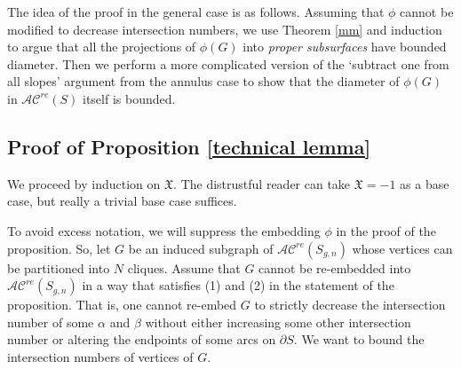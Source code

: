 \documentclass[11pt]{amsart}
\theoremstyle{remark}
\numberwithin{equation}{section}
\newcommand{\cAC}{\mathcal{AC}}
\newcommand{\acre}{\cAC^{re}}
\begin{document}
%



 




	
The idea of the proof in the general case is as follows. Assuming that $\phi$ cannot be modified to decrease intersection numbers, we use Theorem \ref{mm} and induction to argue that all the projections of $\phi(G)$ into \emph{proper subsurfaces} have bounded diameter.  Then we perform a more complicated version of the `subtract one from all slopes' argument from the annulus case to show that the diameter of $\phi(G)$ in $\acre(S)$ itself is bounded.
 
\subsection{Proof of Proposition \ref{technical lemma}}
We proceed by induction on $\mathfrak X$.  The distrustful reader can take $\mathfrak X=-1$ as a base case, but really a trivial base case suffices. 

 To avoid excess notation, we will suppress the embedding $\phi$ in the proof of the proposition. So, let $G$ be an  induced subgraph of $\acre(S_{g,n})$ whose vertices can be partitioned into $N$ cliques. Assume that $G$ cannot be re-embedded into $\acre(S_{g,n})$ in a way that satisfies (1) and (2) in the statement of the proposition. That is, one cannot re-embed $G$ to strictly decrease the intersection number of some $\alpha$ and $\beta$ without either increasing some other intersection number or altering the endpoints of some arcs on $\partial S $.  We want to bound the intersection numbers of vertices of $G$.
\end{document}
